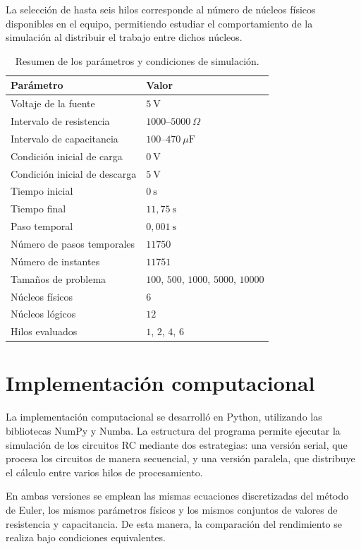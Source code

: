 \documentclass[11pt,a4paper]{article}
\begin{document}
La selección de hasta seis hilos corresponde al número de
núcleos físicos disponibles en el equipo, permitiendo
estudiar el comportamiento de la simulación al distribuir
el trabajo entre dichos núcleos.

\begin{table}[H]
\centering
\caption{Resumen de los parámetros y condiciones de simulación.}
\label{tab:parametros}
\begin{tabular}{ll}
\toprule
\textbf{Parámetro} & \textbf{Valor} \\
\midrule
Voltaje de la fuente & $5\ \text{V}$ \\
Intervalo de resistencia & $1000$--$5000\ \Omega$ \\
Intervalo de capacitancia & $100$--$470\ \mu\text{F}$ \\
Condición inicial de carga & $0\ \text{V}$ \\
Condición inicial de descarga & $5\ \text{V}$ \\
Tiempo inicial & $0\ \text{s}$ \\
Tiempo final & $11,75\ \text{s}$ \\
Paso temporal & $0,001\ \text{s}$ \\
Número de pasos temporales & $11750$ \\
Número de instantes & $11751$ \\
Tamaños de problema & $100$, $500$, $1000$, $5000$, $10000$ \\
Núcleos físicos & $6$ \\
Núcleos lógicos & $12$ \\
Hilos evaluados & $1$, $2$, $4$, $6$ \\
\bottomrule
\end{tabular}
\end{table}



\section{Implementación computacional}

La implementación computacional se desarrolló en Python, utilizando las bibliotecas NumPy y Numba. La estructura del programa permite ejecutar la simulación de los circuitos RC mediante dos estrategias: una versión serial, que procesa los circuitos de manera secuencial, y una versión paralela, que distribuye el cálculo entre varios hilos de procesamiento.

En ambas versiones se emplean las mismas ecuaciones discretizadas del método de Euler, los mismos parámetros físicos y los mismos conjuntos de valores de resistencia y capacitancia. De esta manera, la comparación del rendimiento se realiza bajo condiciones equivalentes.
\end{document}
